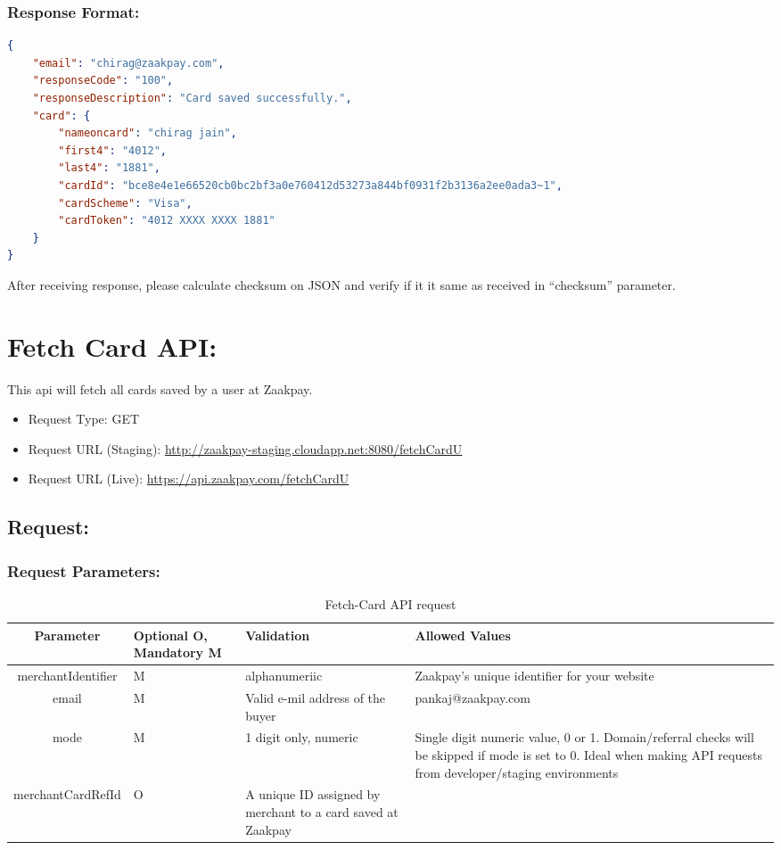\documentclass{article}
\begin{document}
\subsubsection{Response Format:}
 \begin{lstlisting}[language=json,breaklines=true]
{ 
    "email": "chirag@zaakpay.com", 
    "responseCode": "100", 
    "responseDescription": "Card saved successfully.", 
    "card": { 
        "nameoncard": "chirag jain", 
        "first4": "4012", 
        "last4": "1881", 
        "cardId": "bce8e4e1e66520cb0bc2bf3a0e760412d53273a844bf0931f2b3136a2ee0ada3~1", 
        "cardScheme": "Visa", 
        "cardToken": "4012 XXXX XXXX 1881" 
    } 
} 
\end{lstlisting}
After receiving response, please calculate checksum on JSON and verify if it it same as received in “checksum”  parameter.
 \newpage
 \section{Fetch Card API:}
 This api will fetch all cards saved by a user at Zaakpay. 
 \\
\begin{itemize}
\item Request Type: GET
\item Request URL (Staging): \url{http://zaakpay-staging.cloudapp.net:8080/fetchCardU}
\item Request URL (Live): \url{https://api.zaakpay.com/fetchCardU}
\end{itemize}
 \subsection{Request:}
 \subsubsection{Request Parameters:}
 
 \begin{longtable}{||c|| p{2.09cm}|| p{5.5cm}| p{4.7cm}||}
 \caption{Fetch-Card API request}\\
    \rowcolor{green!50}
\bfseries{Parameter} & \bfseries{Optional O, Mandatory M} & \bfseries{Validation} & \bfseries{Allowed Values} \\ \hline
merchantIdentifier & M & alphanumeriic& Zaakpay's unique identifier for your website \\
email & M& Valid e-mil address of the buyer& pankaj@zaakpay.com \\
mode & M& 1 digit only, numeric& Single digit numeric value, 0 or 1. Domain/referral checks will be skipped if mode is set to 0. Ideal when making API requests from developer/staging environments \\
merchantCardRefId & O&A unique ID assigned by merchant to a card saved at Zaakpay & \\
\end{longtable}
\end{document}
